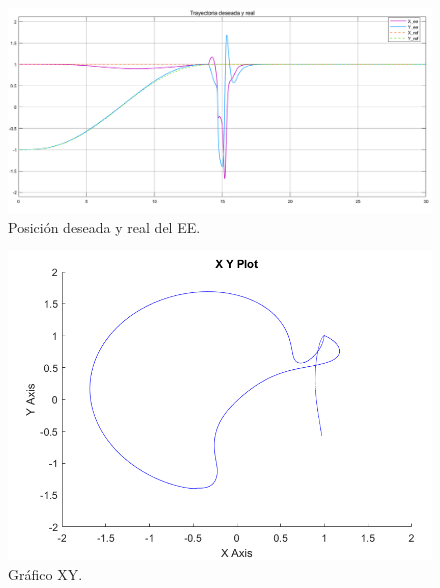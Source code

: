 \begin{figure}[H]
	\centering
	\includegraphics[width=0.8\linewidth]{ImagenesControl de posición no lineal/1_3_e_b}
	\caption{Posición deseada y real del EE.}	
	\label{fig:aposd}
\end{figure}

\begin{figure}[H]
	\centering
	\includegraphics[width=0.5\linewidth]{ImagenesControl de posición no lineal/1_3_e_c}
	\caption{Gráfico XY.}	
	\label{fig:axyd}
\end{figure}

%